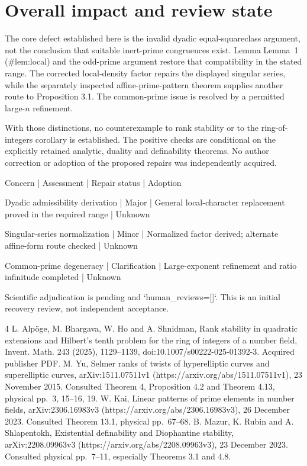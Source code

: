 \documentclass[10pt]{article}
\begin{document}
\section*{Overall impact and review state}
The core defect established here is the invalid dyadic equal-squareclass argument, not the conclusion that suitable inert-prime congruences exist. Lemma Lemma 1 (\#lem:local) and the odd-prime argument restore that compatibility in the stated range. The corrected local-density factor repairs the displayed singular series, while the separately inspected affine-prime-pattern theorem supplies another route to Proposition 3.1. The common-prime issue is resolved by a permitted large-\(n\) refinement.\par
With those distinctions, no counterexample to rank stability or to the ring-of-integers corollary is established. The positive checks are conditional on the explicitly retained analytic, duality and definability theorems. No author correction or adoption of the proposed repairs was independently acquired.\par
Concern | Assessment | Repair status | Adoption\par
Dyadic admissibility derivation | Major | General local-character replacement proved in the required range | Unknown\par
Singular-series normalization | Minor | Normalized factor derived; alternate affine-form route checked | Unknown\par
Common-prime degeneracy | Clarification | Large-exponent refinement and ratio infinitude completed | Unknown\par
Scientific adjudication is pending and `human\_reviews=[]`. This is an initial recovery review, not independent acceptance.\par
4 L. Alpöge, M. Bhargava, W. Ho and A. Shnidman, Rank stability in quadratic extensions and Hilbert’s tenth problem for the ring of integers of a number field, Invent. Math. 243 (2025), 1129–1139, doi:10.1007/s00222-025-01392-3. Acquired publisher PDF. M. Yu, Selmer ranks of twists of hyperelliptic curves and superelliptic curves, arXiv:1511.07511v1 (https://arxiv.org/abs/1511.07511v1), 23 November 2015. Consulted Theorem 4, Proposition 4.2 and Theorem 4.13, physical pp. 3, 15–16, 19. W. Kai, Linear patterns of prime elements in number fields, arXiv:2306.16983v3 (https://arxiv.org/abs/2306.16983v3), 26 December 2023. Consulted Theorem 13.1, physical pp. 67–68. B. Mazur, K. Rubin and A. Shlapentokh, Existential definability and Diophantine stability, arXiv:2208.09963v3 (https://arxiv.org/abs/2208.09963v3), 23 December 2023. Consulted physical pp. 7–11, especially Theorems 3.1 and 4.8.\par
\end{document}
